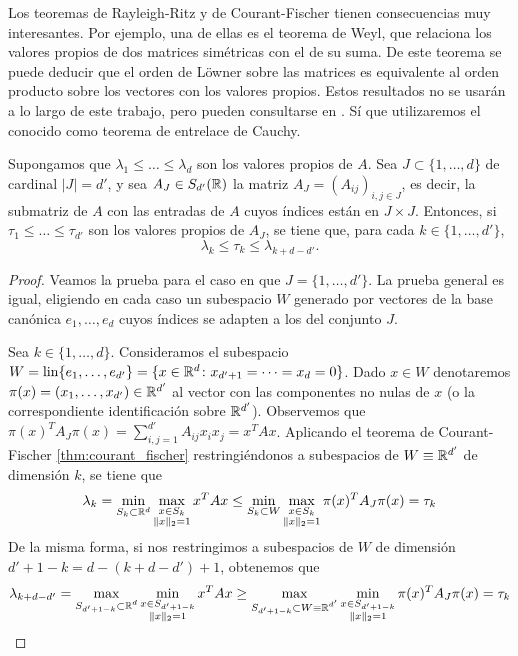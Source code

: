 Los teoremas de Rayleigh-Ritz y de Courant-Fischer tienen consecuencias muy interesantes. Por ejemplo, una de ellas es el teorema de Weyl, que relaciona los valores propios de dos matrices simétricas con el de su suma. De este teorema se puede deducir que el orden de Löwner sobre las matrices es equivalente al orden producto sobre los vectores con los valores propios. Estos resultados no se usarán a lo largo de este trabajo, pero pueden consultarse en \cite{matrix_analysis,zhang2011matrix}. Sí que utilizaremos el conocido como teorema de entrelace de Cauchy.

\begin{thm} \label{thm:interlacing}
    Supongamos que $\lambda_1 \le \dots \le \lambda_d$ son los valores propios de $A$. Sea $J \subset \{1, \dots, d\}$ de cardinal $|J| = d'$, y sea $A_J \in S_{d'}(\mathbb{R})$ la matriz $A_J = (A_{ij})_{i,j \in J}$, es decir, la submatriz de $A$ con las entradas de $A$ cuyos índices están en $J \times J$. Entonces, si $\tau_1 \le \dots \le \tau_{d'}$ son los valores propios de $A_J$, se tiene que, para cada $k \in \{1,\dots,d'\}$,
    \[ \lambda_k \le \tau_k \le \lambda_{k+d-d'}. \]
\end{thm}

\begin{proof}
    Veamos la prueba para el caso en que $J = \{1,\dots,d'\}$. La prueba general es igual, eligiendo en cada caso un subespacio $W$ generado por vectores de la base canónica $e_1, \dots, e_d$ cuyos índices se adapten a los del conjunto $J$. 

    Sea $k \in \{1,\dots,d\}$. Consideramos el subespacio $W = \operatorname{lin}\{e_1,\dots,e_{d'}\} = \{ x \in \mathbb{R}^d \colon x_{d'+1} = \dots = x_d = 0\}$. Dado $x \in W$ denotaremos $\pi(x) = (x_1,\dots,x_{d'}) \in \mathbb{R}^{d'}$ al vector con las componentes no nulas de $x$ (o la correspondiente identificación sobre $\mathbb{R}^{d'}$). Observemos que $\pi(x)^TA_J\pi(x) = \sum_{i,j=1}^{d'}A_{ij}x_ix_j = x^TAx$. Aplicando el teorema de Courant-Fischer \ref{thm:courant_fischer} restringiéndonos a subespacios de $W \equiv \mathbb{R}^{d'}$ de dimensión $k$, se tiene que
    \[ \lambda_k = \min_{S_k \subset \mathbb{R}^d} \max_{\substack{x \in S_k \\ \|x\|_2 = 1}} x^TAx \le \min_{S_k \subset W} \max_{\substack{x \in S_k \\ \|x\|_2 = 1}} \pi(x)^TA_J\pi(x) = \tau_k  \]
    De la misma forma, si nos restringimos a subespacios de $W$ de dimensión $d' + 1 -k = d - (k+d-d') + 1$, obtenemos que
    \[  \lambda_{k+d-d'} = \max_{\substack{S_{d'+1-k} \subset \mathbb{R}^d}} \min_{\substack{x \in S_{d'+1-k} \\ \|x\|_2 = 1}} x^TAx \ge \max_{\substack{S_{d'+1-k} \subset W \equiv \mathbb{R}^{d'}}} \min_{\substack{x \in S_{d'+1-k} \\ \|x\|_2 = 1}} \pi(x)^TA_J\pi(x) = \tau_k \]
\end{proof}

